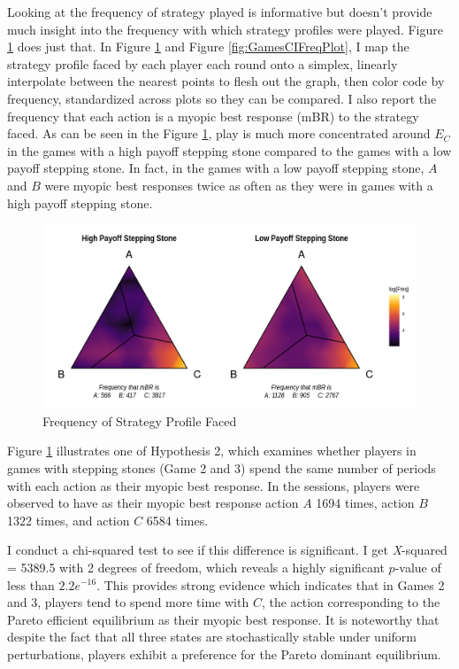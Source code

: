 Looking at the frequency of strategy played is informative but doesn't provide much insight into the frequency with which strategy profiles were played. Figure \ref{fig:Games23FreqPlot} does just that. In Figure \ref{fig:Games23FreqPlot} and Figure \ref{fig:GamesCIFreqPlot}, I map the strategy profile faced by each player each round onto a simplex, linearly interpolate between the nearest points to flesh out the graph, then color code by frequency, standardized across plots so they can be compared. I also report the frequency that each action is a myopic best response (mBR) to the strategy faced. As can be seen in the Figure \ref{fig:Games23FreqPlot}, play is much more concentrated around $E_C$ in the games with a high payoff stepping stone compared to the games with a low payoff stepping stone. In fact, in the games with a low payoff stepping stone, $A$ and $B$ were myopic best responses twice as often as they were in games with a high payoff stepping stone.

\begin{figure}[h]
\captionsetup{justification=centering}
  \caption[caption]{Frequency of Strategy Profile Faced}
   \label{fig:Games23FreqPlot}
    \includegraphics[width = \textwidth]{Images/Games23FreqPlot.png}
\end{figure}

Figure \ref{fig:Games23FreqPlot} illustrates one of Hypothesis 2, which examines whether players in games with stepping stones (Game 2 and 3) spend the same number of periods with each action as their myopic best response. In the sessions, players were observed to have as their myopic best response action $A$ 1694 times, action $B$ 1322 times, and action $C$ 6584 times. 

I conduct a chi-squared test to see if this difference is significant. I get \textit{X}-squared = 5389.5 with 2 degrees of freedom, which reveals a highly significant $p$-value of less than $2.2e^{-16}$. This provides strong evidence which indicates that in Games 2 and 3, players tend to spend more time with $C$, the action corresponding to the Pareto efficient equilibrium as their myopic best response. It is noteworthy that despite the fact that all three states are stochastically stable under uniform perturbations, players exhibit a preference for the Pareto dominant equilibrium.

